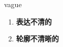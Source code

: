 
\begin{frame}
{\huge vague}
\begin{center}
\begin{enumerate}\Large
  \item \textbf{表达不清的}
  \item \textbf{轮廓不清晰的}
\end{enumerate}
\end{center}
\end{frame}
